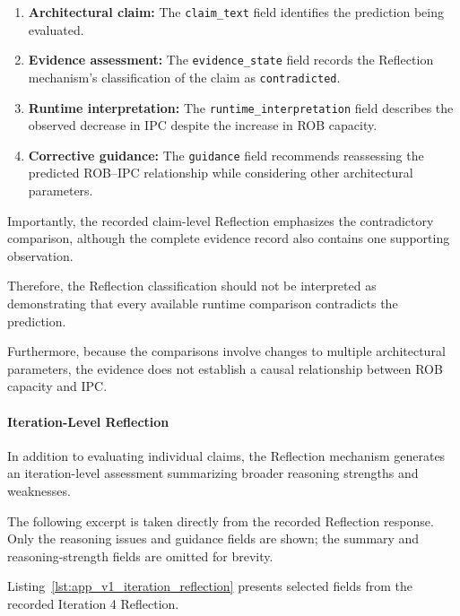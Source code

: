 \begin{enumerate}

\item \textbf{Architectural claim:}
The \texttt{claim\_text} field identifies
the prediction being evaluated.

\item \textbf{Evidence assessment:}
The \texttt{evidence\_state} field records
the Reflection mechanism's classification
of the claim as \texttt{contradicted}.

\item \textbf{Runtime interpretation:}
The \texttt{runtime\_interpretation} field
describes the observed decrease in IPC
despite the increase in ROB capacity.

\item \textbf{Corrective guidance:}
The \texttt{guidance} field recommends
reassessing the predicted ROB--IPC
relationship while considering other
architectural parameters.

\end{enumerate}

Importantly, the recorded claim-level
Reflection emphasizes the contradictory
comparison, although the complete evidence
record also contains one supporting
observation.

Therefore, the Reflection classification
should not be interpreted as demonstrating
that every available runtime comparison
contradicts the prediction.

Furthermore, because the comparisons
involve changes to multiple architectural
parameters, the evidence does not establish
a causal relationship between ROB capacity
and IPC.


\paragraph{Iteration-Level Reflection}

In addition to evaluating individual claims,
the Reflection mechanism generates an
iteration-level assessment summarizing
broader reasoning strengths and weaknesses.


The following excerpt is taken directly from
the recorded Reflection response. Only the
reasoning issues and guidance fields are shown;
the summary and reasoning-strength fields are
omitted for brevity.


Listing~\ref{lst:app_v1_iteration_reflection}
presents selected fields from the recorded
Iteration 4 Reflection.


